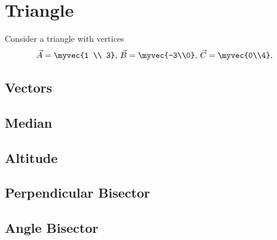 \documentclass[11pt]{book}
\begin{document}
\frontmatter
\tableofcontents
\setcounter{page}{1}
\mainmatter
\chapter{Triangle}
Consider a triangle with vertices
\begin{align}
\label{eq:tri-pts}
\vec{A}=\myvec{1 \\ 3},\,
\vec{B}=\myvec{-3\\0},\,
	\vec{C}=\myvec{0\\4},\,
\end{align}

\section{Vectors}
\section{Median}
\section{Altitude}
\section{Perpendicular Bisector}
\section{Angle Bisector}
\end{document}
